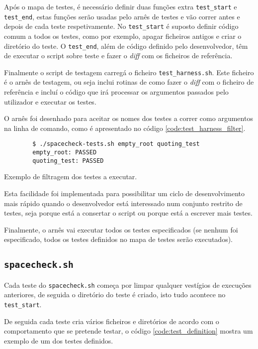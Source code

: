 Após o mapa de testes, é necessário definir duas funções extra \Verb|test_start|
e \Verb|test_end|, estas funções serão usadas pelo arnês de testes e vão correr
antes e depois de cada teste respetivamente. No \Verb|test_start| é suposto
definir código comum a todos os testes, como por exemplo, apagar ficheiros
antigos e criar o diretório do teste. O \Verb|test_end|, além de código definido
pelo desenvolvedor, têm de executar o script sobre teste e fazer o \emph{diff}
com os ficheiros de referência.

Finalmente o script de testagem carregá o ficheiro \Verb|test_harness.sh|. Este
ficheiro é o arnês de testagem, ou seja inclui rotinas de como fazer o
\emph{diff} com o ficheiro de referência e incluí o código que irá processar
os argumentos passados pelo utilizador e executar os testes.

O arnês foi desenhado para aceitar os nomes dos testes a correr como argumentos
na linha de comando, como é apresentado no código \ref{code:test_harness_filter}.

\begin{listing}[H]
	\centering
	\begin{verbatim}
		$ ./spacecheck-tests.sh empty_root quoting_test
		empty_root: PASSED
		quoting_test: PASSED
	\end{verbatim}
	\cprotect\caption{Exemplo de filtragem dos testes a executar.}
	\label{code:test_harness_filter}
\end{listing}

Esta facilidade foi implementada para possibilitar um ciclo de desenvolvimento
mais rápido quando o desenvolvedor está interessado num conjunto restrito de
testes, seja porque está a consertar o script ou porque está a escrever mais
testes.

Finalmente, o arnês vai executar todos os testes especificados (se nenhum foi
especificado, todos os testes definidos no mapa de testes serão executados).

\cprotect\subsection{\Verb|spacecheck.sh|}

Cada teste do \Verb|spacecheck.sh| começa por limpar
qualquer vestígios de execuções anteriores, de seguida o diretório do teste
é criado, isto tudo acontece no \Verb|test_start|.

De seguida cada teste cria vários ficheiros e diretórios de acordo com o
comportamento que se pretende testar, o código \ref{code:test_definition} mostra
um exemplo de um dos testes definidos.

